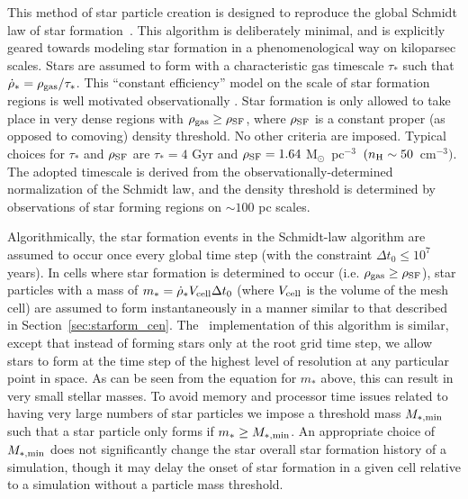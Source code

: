 This method of star particle creation is designed to reproduce
the global Schmidt law of star formation~\citep{2003ApJ...590L...1K,
  1959ApJ...129..243S}.  This algorithm is deliberately minimal, and
is explicitly geared towards modeling star formation in a
phenomenological way on kiloparsec scales.  Stars are assumed to form
with a characteristic gas timescale $\tau_*$ such that $\dot{\rho}_* =
\rho_{\rm gas}/\tau_*$. 
This ``constant
efficiency'' model on the scale of star formation regions is well
motivated observationally
\citep{1996AJ....112.1903Y,2002ApJ...569..157W}.  Star formation is
only allowed to take place in very dense regions with $\rho_{\rm gas}
\geq \rho_{\rm SF}$, where $\rho_{\rm SF}$ is a constant proper (as
opposed to comoving) density threshold.  No other criteria are
imposed.  Typical choices for $\tau_*$ and $\rho_{\rm SF}$ are $\tau_*
= 4$ Gyr and $\rho_{\rm SF} = 1.64~$M$_\odot$~pc$^{-3}$~$(n_{\rm H}
\sim 50$~cm$^{-3})$.  The adopted timescale is derived from the
observationally-determined normalization of the Schmidt law, and the
density threshold is determined by observations of star forming
regions on $\sim 100$ pc scales.

Algorithmically, the star formation events in the Schmidt-law algorithm are
assumed to occur once every global time step (with the constraint $\Delta t_0 \leq
10^7$ years).
In cells where star formation is determined to occur (i.e. $\rho_{\rm
  gas} \geq \rho_{\rm SF}$), star particles with a mass of $m_* =
\dot{\rho}_* V_{\rm cell} \Delta t_0$ (where $V_{\rm cell}$ is the
volume of the mesh cell) are assumed to form instantaneously in a
manner similar to that described in Section~\ref{sec:starform_cen}.
The \enzo\ implementation of this algorithm is similar, except that
instead of forming stars only at the root grid time step, we allow
stars to form at the time step of the highest level of resolution at
any particular point in space.  As can be seen from the equation for
$m_*$ above, this can result in very small stellar masses.  To avoid
memory and processor time issues related to having very large numbers
of star particles we impose a threshold mass $M_{\rm *,min}$ such that
a star particle only forms if $m_* \geq M_{\rm *,min}$.  An
appropriate choice of $M_{\rm *,min}$ does not significantly change
the star overall star formation history of a simulation, though it may
delay the onset of star formation in a given cell relative to a
simulation without a particle mass threshold.

